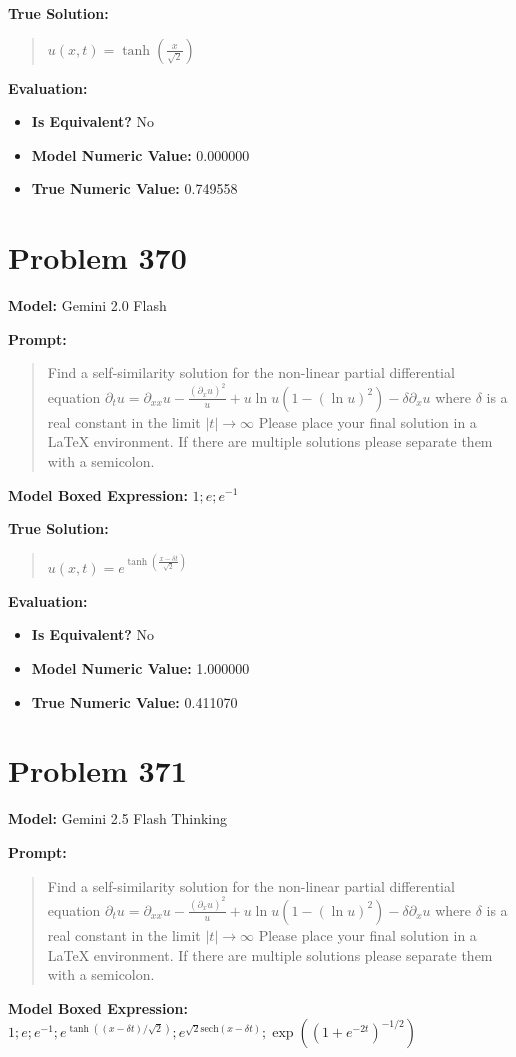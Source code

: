\documentclass{article}
\begin{document}
{\textbf{True Solution:}
\begin{quote}
$u(x, t) = \tanh\left( \frac{x }{\sqrt{2}} \right)$
\end{quote}

\textbf{Evaluation:}
\begin{itemize}
\item \textbf{Is Equivalent?} No
\item \textbf{Model Numeric Value:} 0.000000
\item \textbf{True Numeric Value:} 0.749558
\end{itemize}
\vspace{1cm}
\section*{Problem 370}
\textbf{Model:} Gemini 2.0 Flash

\textbf{Prompt:}
\begin{quote}
Find a self-similarity solution for the non-linear partial differential equation $ \partial_t u = \partial_{xx} u - \frac{(\partial_x u)^2}{u} + u \ln u \left(1 - (\ln u)^2\right) - \delta \partial_x u $ where $\delta$ is a real constant in the limit $|t| \rightarrow \infty$ Please place your final solution in a $\boxed{}$ LaTeX environment. If there are multiple solutions please separate them with a semicolon.
\end{quote}
\textbf{Model Boxed Expression:} $1; e; e^{-1}$

\textbf{True Solution:}
\begin{quote}
$u(x,t) = e^{\tanh\left(\frac{x-\delta t}{\sqrt{2}}\right)}$
\end{quote}

\textbf{Evaluation:}
\begin{itemize}
\item \textbf{Is Equivalent?} No
\item \textbf{Model Numeric Value:} 1.000000
\item \textbf{True Numeric Value:} 0.411070
\end{itemize}
\vspace{1cm}
\section*{Problem 371}
\textbf{Model:} Gemini 2.5 Flash Thinking

\textbf{Prompt:}
\begin{quote}
Find a self-similarity solution for the non-linear partial differential equation $ \partial_t u = \partial_{xx} u - \frac{(\partial_x u)^2}{u} + u \ln u \left(1 - (\ln u)^2\right) - \delta \partial_x u $ where $\delta$ is a real constant in the limit $|t| \rightarrow \infty$ Please place your final solution in a $\boxed{}$ LaTeX environment. If there are multiple solutions please separate them with a semicolon.
\end{quote}
\textbf{Model Boxed Expression:} $1; e; e^{-1}; e^{\tanh((x-\delta t)/\sqrt{2})}; e^{\sqrt{2}\mathrm{sech}(x-\delta t)}; \exp\left(\left(1+e^{-2t}\right)^{-1/2}\right)$

}
\end{document}
